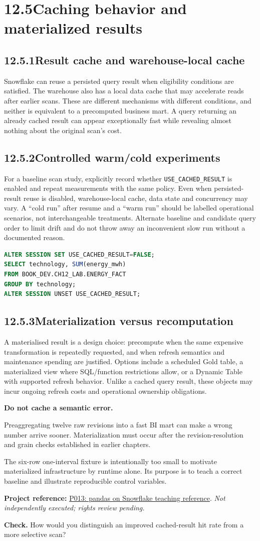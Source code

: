\documentclass[11pt,twoside]{article}
\newcommand{\topic}[2]{\subsection*{#1\quad #2}}
\newcommand{\repo}[2]{\par\begingroup\fontsize{8.0}{9.6}\selectfont\sffamily\color{inkgray}\textbf{Project reference:} \href{#2}{#1}. \textit{Not independently executed; rights review pending.}\par\endgroup}
\begin{document}
\section*{12.5\quad Caching behavior and materialized results}
\topic{12.5.1}{Result cache and warehouse-local cache}
Snowflake can reuse a persisted query result when eligibility conditions are satisfied. The warehouse also has a local data cache that may accelerate reads after earlier scans. These are different mechanisms with different conditions, and neither is equivalent to a precomputed business mart. A query returning an already cached result can appear exceptionally fast while revealing almost nothing about the original scan's cost.
\topic{12.5.2}{Controlled warm/cold experiments}
For a baseline scan study, explicitly record whether \texttt{USE\_CACHED\_RESULT} is enabled and repeat measurements with the same policy. Even when persisted-result reuse is disabled, warehouse-local cache, data state and concurrency may vary. A ``cold run'' after resume and a ``warm run'' should be labelled operational scenarios, not interchangeable treatments. Alternate baseline and candidate query order to limit drift and do not throw away an inconvenient slow run without a documented reason.
\begin{lstlisting}[language=SQL,caption={An isolated, reversible experimental session.}]
ALTER SESSION SET USE_CACHED_RESULT=FALSE;
SELECT technology, SUM(energy_mwh)
FROM BOOK_DEV.CH12_LAB.ENERGY_FACT
GROUP BY technology;
ALTER SESSION UNSET USE_CACHED_RESULT;
\end{lstlisting}
\topic{12.5.3}{Materialization versus recomputation}
A materialised result is a design choice: precompute when the same expensive transformation is repeatedly requested, and when refresh semantics and maintenance spending are justified. Options include a scheduled Gold table, a materialized view where SQL/function restrictions allow, or a Dynamic Table with supported refresh behavior. Unlike a cached query result, these objects may incur ongoing refresh costs and operational ownership obligations.
\begin{insight}\textbf{Do not cache a semantic error.}\par
Preaggregating twelve raw revisions into a fast BI mart can make a wrong number arrive sooner. Materialization must occur after the revision-resolution and grain checks established in earlier chapters.\end{insight}
The six-row one-interval fixture is intentionally too small to motivate materialized infrastructure by runtime alone. Its purpose is to teach a correct baseline and illustrate reproducible control variables.
\repo{P013: pandas on Snowflake teaching reference}{https://github.com/Snowflake-Labs/sfguide-getting-started-with-pandas-on-snowflake}
\textbf{Check.} How would you distinguish an improved cached-result hit rate from a more selective scan?
\newpage
\end{document}
